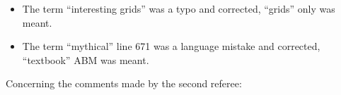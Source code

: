 \documentclass[11pt,a4paper,sans]{moderncv}        %
\begin{document}
\begin{itemize}
	\item The term ``interesting grids'' was a typo and corrected, ``grids'' only was meant.
	
	\item The term ``mythical'' line 671 was a language mistake and corrected, ``textbook'' ABM was meant.
\end{itemize}




Concerning the comments made by the second referee:


\end{document}

